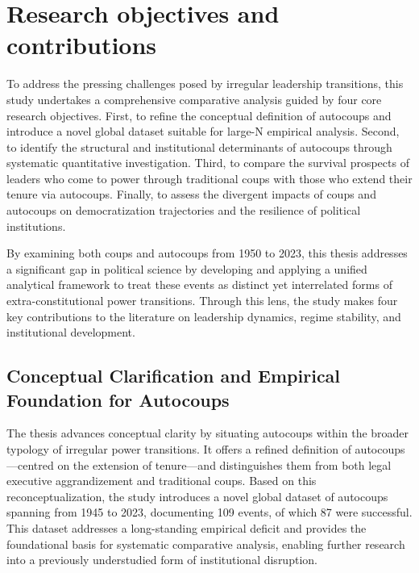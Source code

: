 \documentclass[
  12pt,
]{report}
\begin{document}
\section{Research objectives and
contributions}\label{research-objectives-and-contributions}

To address the pressing challenges posed by irregular leadership
transitions, this study undertakes a comprehensive comparative analysis
guided by four core research objectives. First, to refine the conceptual
definition of autocoups and introduce a novel global dataset suitable
for large-N empirical analysis. Second, to identify the structural and
institutional determinants of autocoups through systematic quantitative
investigation. Third, to compare the survival prospects of leaders who
come to power through traditional coups with those who extend their
tenure via autocoups. Finally, to assess the divergent impacts of coups
and autocoups on democratization trajectories and the resilience of
political institutions.

By examining both coups and autocoups from 1950 to 2023, this thesis
addresses a significant gap in political science by developing and
applying a unified analytical framework to treat these events as
distinct yet interrelated forms of extra-constitutional power
transitions. Through this lens, the study makes four key contributions
to the literature on leadership dynamics, regime stability, and
institutional development.

\subsection*{Conceptual Clarification and Empirical Foundation for
Autocoups}\label{conceptual-clarification-and-empirical-foundation-for-autocoups}

The thesis advances conceptual clarity by situating autocoups within the
broader typology of irregular power transitions. It offers a refined
definition of autocoups---centred on the extension of tenure---and
distinguishes them from both legal executive aggrandizement and
traditional coups. Based on this reconceptualization, the study
introduces a novel global dataset of autocoups spanning from 1945 to
2023, documenting 109 events, of which 87 were successful. This dataset
addresses a long-standing empirical deficit and provides the
foundational basis for systematic comparative analysis, enabling further
research into a previously understudied form of institutional
disruption.
\end{document}
